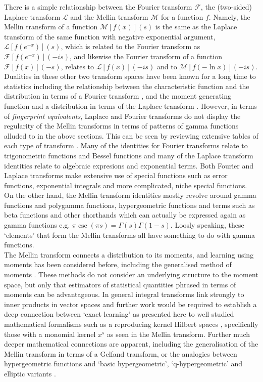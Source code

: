 \documentclass{article}
\begin{document}
There is a simple relationship between the Fourier transform $\mathcal{F}$, the (two-sided) Laplace transform $\mathcal{L}$ and the Mellin transform $\mathcal{M}$ for a function $f$. Namely, the Mellin transform of a function $\mathcal{M}[f(x)](s)$ is the same as the Laplace transform of the same function with negative exponential argument, $\mathcal{L}[f(e^{-x})](s)$, which is related to the Fourier transform as $\mathcal{F}[f(e^{-x})](-is)$, and likewise the Fourier transform of a function $\mathcal{F}[f(x)](-s)$, relates to $\mathcal{L}[f(x)](-is)$ and to $\mathcal{M}[f(-\ln x)](-is)$.\\

Dualities in these other two transform spaces have been known for a long time to statistics including the relationship between the characteristic function and the distribution in terms of a Fourier transform \cite{Waller1995}, and the moment generating function and a distribution in terms of the Laplace transform \cite{Spataru2007}. However, in terms of \emph{fingerprint equivalents}, Laplace and Fourier transforms do not display the regularity of the Mellin transforms in terms of patterns of gamma functions alluded to in the above sections. This can be seen by reviewing extensive tables of each type of transform \cite{Bateman1953}. Many of the identities for Fourier transforms relate to trigonometric functions and Bessel functions and many of the Laplace transform identities relate to algebraic expresions and exponential terms. Both Fourier and Laplace transforms make extensive use of special functions such as error functions, exponential integrals and more complicated, niche special functions. On the other hand, the Mellin transform identities mostly revolve around gamma functions and polygamma functions, hypergeometric functions and terms such as beta functions and other shorthands which can actually be expressed again as gamma functions e.g. $\pi \csc(\pi s)=\Gamma(s)\Gamma(1-s)$. Loosly speaking, these `elements' that form the Mellin transforms all have something to do with gamma functions. \\


The Mellin transform connects a distribution to its moments, and learning using moments has been considered before, including the generalised method of moments \cite{Zsohar2012}. These methods do not consider an underlying structure to the moment space, but only that estimators of statistical quantities phrased in terms of moments can be advantageous. In general integral transforms link strongly to inner products in vector spaces and further work would be required to establish a deep connection between `exact learning' as presented here to well studied mathematical formalisms such as a reproducing kernel Hilbert spaces \cite{Wahba2003}, specifically those with a monomial kernel $x^s$ as seen in the Mellin transform. Further much deeper mathematical connections are apparent, including the generalisation of the Mellin transform in terms of a Gelfand transform, or the analogies between hypergeometric functions and `basic hypergeometric', `q-hypergeometric' and elliptic variants \cite{Thakur1991}.\\
\end{document}
